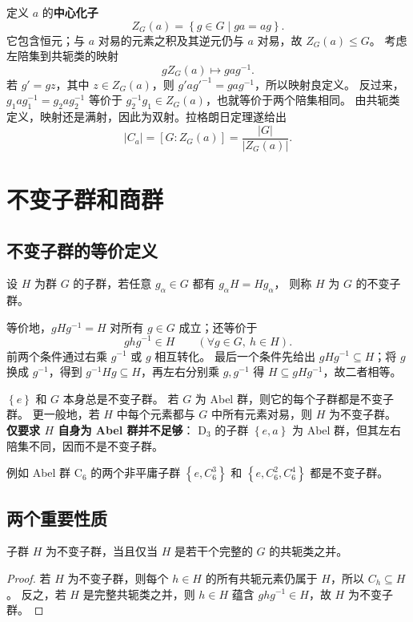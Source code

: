 定义 $a$ 的\textbf{中心化子}
\begin{equation}
Z_G\left(a\right)=\left\{g\in G\mid ga=ag\right\}.
\end{equation}
它包含恒元；与 $a$ 对易的元素之积及其逆元仍与 $a$ 对易，故 $Z_G\left(a\right)\leq G$。
考虑左陪集到共轭类的映射
\begin{equation}
gZ_G\left(a\right)\longmapsto gag^{-1}.
\end{equation}
若 $g'=gz$，其中 $z\in Z_G\left(a\right)$，则 $g'ag'^{-1}=gag^{-1}$，所以映射良定义。
反过来，$g_1ag_1^{-1}=g_2ag_2^{-1}$ 等价于
$g_2^{-1}g_1\in Z_G\left(a\right)$，也就等价于两个陪集相同。
由共轭类定义，映射还是满射，因此为双射。拉格朗日定理遂给出
\begin{equation}
|C_a|=\left[G:Z_G\left(a\right)\right]=\frac{|G|}{|Z_G\left(a\right)|}.
\end{equation}

\section{不变子群和商群}
\subsection{不变子群的等价定义}
\begin{definition}[不变子群]
设 $H$ 为群 $G$ 的子群，若任意 $g_\alpha\in G$ 都有 $g_\alpha H=Hg_\alpha$，
则称 $H$ 为 $G$ 的不变子群。
\end{definition}
等价地，$gHg^{-1}=H$ 对所有 $g\in G$ 成立；还等价于
\begin{equation}
ghg^{-1}\in H\qquad\left(\forall g\in G,\ h\in H\right).
\end{equation}
前两个条件通过右乘 $g^{-1}$ 或 $g$ 相互转化。
最后一个条件先给出 $gHg^{-1}\subseteq H$；将 $g$ 换成 $g^{-1}$，得到
$g^{-1}Hg\subseteq H$，再左右分别乘 $g,g^{-1}$ 得 $H\subseteq gHg^{-1}$，故二者相等。

$\left\{e\right\}$ 和 $G$ 本身总是不变子群。
若 $G$ 为 Abel 群，则它的每个子群都是不变子群。
更一般地，若 $H$ 中每个元素都与 $G$ 中所有元素对易，则 $H$ 为不变子群。
\textbf{仅要求 $H$ 自身为 Abel 群并不足够}：
$\mathrm{D}_3$ 的子群 $\left\{e,a\right\}$ 为 Abel 群，但其左右陪集不同，因而不是不变子群。

例如 Abel 群 $\mathrm{C}_6$ 的两个非平庸子群
$\left\{e,C_6^3\right\}$ 和 $\left\{e,C_6^2,C_6^4\right\}$ 都是不变子群。

\subsection{两个重要性质}
\begin{proposition}
子群 $H$ 为不变子群，当且仅当 $H$ 是若干个完整的 $G$ 的共轭类之并。
\end{proposition}
\begin{proof}
若 $H$ 为不变子群，则每个 $h\in H$ 的所有共轭元素仍属于 $H$，所以 $C_h\subseteq H$。
反之，若 $H$ 是完整共轭类之并，则 $h\in H$ 蕴含 $ghg^{-1}\in H$，故 $H$ 为不变子群。
\end{proof}

